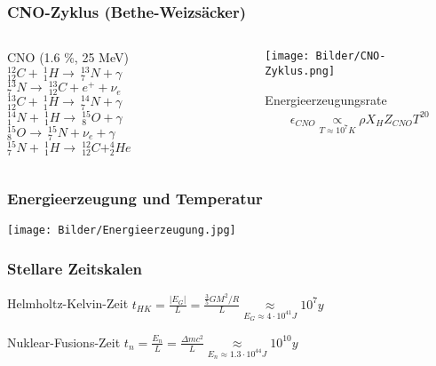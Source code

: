\documentclass{beamer}
\begin{document}
\begin{frame}
  \frametitle{CNO-Zyklus (Bethe-Weizsäcker)}
  
\begin{columns}[t]

\begin{column}{.48\textwidth}

\begin{block}{CNO (1.6 \%, 25 MeV)}
$
^{12}_{12}C + \ ^1_1H \to \ ^{13}_7N + \gamma$\\[0.2cm]
$
^{13}_7N \to \ ^{13}_{12}C + e^+ + \nu_e$\\[0.2cm]
$
^{13}_{12}C + \ ^1_1H \to \ ^{14}_7N + \gamma$\\[0.2cm]
$
^{14}_1N + \ ^1_1H \to \ ^{15}_8O + \gamma$\\[0.2cm]
$
^{15}_8O \to \ ^{15}_7N + \nu_e + \gamma$\\[0.2cm]
$
^{15}_7N + \ ^1_1H \to \ ^{12}_{12}C + ^4_2He$\\[0.2cm]
\end{block}

\end{column}

\begin{column}{.48\textwidth}

\centering
\texttt{[image: Bilder/CNO-Zyklus.png]}

\begin{block}{Energieerzeugungsrate}
\begin{align*}
\epsilon_{CNO} \underset{T \approx 10^7 K}{\propto} \rho X_H Z_{CNO} T^{20}
\end{align*}
\end{block}

\end{column}

\end{columns}

\end{frame}

\begin{frame}
  \frametitle{Energieerzeugung und Temperatur}

\centering
\texttt{[image: Bilder/Energieerzeugung.jpg]}

\end{frame}

\begin{frame}
  \frametitle{Stellare Zeitskalen}

  \begin{block}{Helmholtz-Kelvin-Zeit}
$t_{HK} = \frac{|E_G|}{L} = \frac{\frac{3}{5} G M^2/R}{L} \underset{E_G \approx 4 \cdot 10^{41} J}{\approx} 10^7 y$
  \end{block}

\begin{block}{Nuklear-Fusions-Zeit}
$t_n = \frac{E_n}{L} = \frac{\Delta m c^2}{L} \underset{E_n \approx 1.3 \cdot 10^{44} J}{\approx} 10^{10} y$
  \end{block}

\end{frame}
\end{document}
